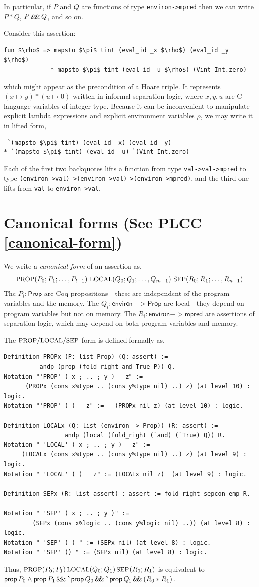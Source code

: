 \documentclass[12pt,fleqn,openany,oneside,showtrims]{memoir}
\newcommand{\ychapter}[2]{\chapter[#1]{#1 \hfill \normalsize #2}}
\begin{document}
In particular, if $P$ and $Q$ are functions of type \lstinline{environ->mpred}
then we can write $P*Q$,  $P \,\mathsf{\&\hspace{-.2em}\&}\, Q$, and so on.

Consider this assertion:
\begin{lstlisting}
fun $\rho$ => mapsto $\pi$ tint (eval_id _x $\rho$) (eval_id _y $\rho$) 
             * mapsto $\pi$ tint (eval_id _u $\rho$) (Vint Int.zero)
\end{lstlisting}
which might appear as the precondition of a Hoare triple.
It represents $(x\mapsto y) *(u\mapsto 0)$ written in informal
separation logic, where $x,y,u$ are C-language variables
of integer type.
Because it can be inconvenient to manipulate explicit lambda expressions
and explicit environment variables $\rho$, we may write it in lifted
form,
\begin{lstlisting}
 `(mapsto $\pi$ tint) (eval_id _x) (eval_id _y) 
* `(mapsto $\pi$ tint) (eval_id _u) `(Vint Int.zero)
\end{lstlisting}
Each of the first two backquotes lifts a function
from type \lstinline{val->val->mpred} to type
\lstinline{(environ->val)->(environ->val)->(environ->mpred)},
and the third one lifts from \lstinline{val} to 
\lstinline{environ->val}.

\ychapter{Canonical forms}{(See PLCC \autoref{canonical-form})}
We write a \emph{canonical form} of an assertion as,
\[
\mbox{\small PROP}(P_0;P_1;\ldots,P_{l-1})~
\mbox{\small LOCAL}(Q_0;Q_1;\ldots,Q_{m-1})~
\mbox{\small SEP}(R_0;R_1;\ldots,R_{n-1})
\]
The $P_i : \mathsf{Prop}$ are Coq propositions---these are independent
of the program variables and the memory.
The $Q_i : \mathsf{environ}->\mathsf{Prop}$ are local---they depend on 
program variables but not on memory.
The $R_i: \mathsf{environ}->\mathsf{mpred}$ are 
assertions of separation logic,
which may depend on both program variables and memory.

The $\mbox{\small PROP}/\mbox{\small LOCAL}/\mbox{\small SEP}$ form is defined formally as,
\begin{lstlisting}
Definition PROPx (P: list Prop) (Q: assert) := 
          andp (prop (fold_right and True P)) Q.
Notation "'PROP' ( x ; .. ; y )   z" := 
      (PROPx (cons x%type .. (cons y%type nil) ..) z) (at level 10) : logic.
Notation "'PROP' ( )   z" :=   (PROPx nil z) (at level 10) : logic.

Definition LOCALx (Q: list (environ -> Prop)) (R: assert) := 
                 andp (local (fold_right (`and) (`True) Q)) R.
Notation " 'LOCAL' ( x ; .. ; y )   z" := 
     (LOCALx (cons x%type .. (cons y%type nil) ..) z) (at level 9) : logic.
Notation " 'LOCAL' ( )   z" := (LOCALx nil z)  (at level 9) : logic.

Definition SEPx (R: list assert) : assert := fold_right sepcon emp R.

Notation " 'SEP' ( x ; .. ; y )" := 
        (SEPx (cons x%logic .. (cons y%logic nil) ..)) (at level 8) : logic.
Notation " 'SEP' ( ) " := (SEPx nil) (at level 8) : logic.
Notation " 'SEP' () " := (SEPx nil) (at level 8) : logic.
\end{lstlisting}
Thus, 
$\mbox{\small PROP} (P_0;P_1)\,\mbox{\small LOCAL}(Q_0;Q_1)\,\mbox{\small SEP}\,(R_0;R_1)$
is equivalent to 
$\mathsf{prop}\,P_0\wedge \mathsf{prop}\,P_1 \,\mathsf{\&\hspace{-.2em}\&}\,
\mbox{\textbf{\`{}}}\mathsf{prop}\,Q_0 \,\mathsf{\&\hspace{-.2em}\&}\, \mbox{\textbf{\`{}}}\mathsf{prop}\,Q_1 \,\mathsf{\&\hspace{-.2em}\&}\,
(R_0 * R_1)$.
\end{document}
